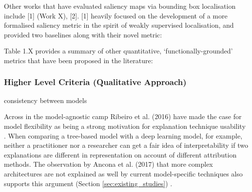 \documentclass[main]{subfiles}
\begin{document}
Other works that have evaluated saliency maps via bounding box localisation include [1] (Work X), [2]. [1] heavily focused on the development of a more formalised saliency metric in the spirit of weakly supervised localisation, and provided two baselines along with their novel metric:

Table 1.X provides a summary of other quantitative, `functionally-grounded' metrics that have been proposed in the literature:

\subsubsection{Higher Level Criteria (Qualitative Approach)}

consistency between models


Across in the model-agnostic camp Ribeiro et al. (2016) have made the case for model flexibility as being a strong motivation for explanation technique usability \cite{case_for_model_ag}. When comparing a tree-based model with a deep learning model, for example, neither a practitioner nor a researcher can get a fair idea of interpretability if two explanations are different in representation on account of different attribution methods. The observation by Ancona et al. (2017) that more complex architectures are not explained as well by current model-specific techniques also supports this argument (Section \ref{sec:existing_studies}) \cite{ancona}.









\end{document}
